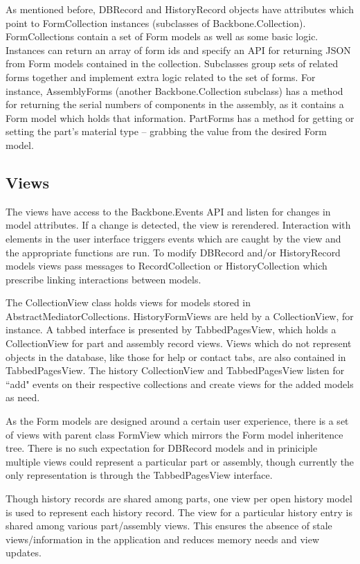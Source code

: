 \documentclass[journal]{IEEEtran}
\begin{document}
As mentioned before, DBRecord and HistoryRecord objects have attributes which point to FormCollection instances (subclasses
of Backbone.Collection).
FormCollections contain a set of Form models as well as some basic logic. Instances can return an array of form ids
and specify an API for returning JSON from Form models contained in the collection. Subclasses 
group sets of related forms together and implement extra logic related to the set of forms. For instance, AssemblyForms (another Backbone.Collection
subclass)
has a method for returning the serial numbers of components in the assembly, as it contains a Form model which holds
that information. PartForms has a method for getting or setting the part's material type -- grabbing the value from the
desired Form model.

\subsection{Views}
The views have access to the Backbone.Events API and listen for changes in model attributes. If a change is detected,
the view is rerendered. Interaction with elements in the user interface triggers events which are caught by the view and the appropriate
functions are run. To modify DBRecord and/or HistoryRecord models views pass messages to 
RecordCollection or HistoryCollection which prescribe linking interactions between models.

The CollectionView class holds views for models stored in AbstractMediatorCollections. HistoryFormViews
are held by a CollectionView, for instance. A tabbed interface is presented by TabbedPagesView,
which holds a CollectionView for part and assembly record views. Views which do not represent objects in the database, like those
for help or contact tabs, are also contained in TabbedPagesView. The history CollectionView and TabbedPagesView
listen for ``add" events on their respective collections and create views for the added models as need.

As the Form models are designed around a certain user experience, there is a set of views with parent class
FormView which mirrors the Form model inheritence tree. There is no such expectation for DBRecord models and
in priniciple multiple views could represent a particular part or assembly, though currently the only representation is
through the TabbedPagesView interface.

Though history records are shared among parts, one view per open history model is used to represent each history
record. The view for a particular history entry is shared among various part/assembly views. This ensures the absence of
stale views/information in the application and reduces memory needs and view updates.
\end{document}
